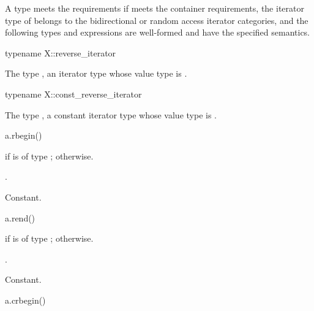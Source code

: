 \pnum
A type  meets the  requirements if
 meets the container requirements,
the iterator type of  belongs to the
bidirectional or random access iterator categories,
and
the following types and expressions are well-formed and have
the specified semantics.

%
\begin{itemdecl}
typename X::reverse_iterator
\end{itemdecl}

\begin{itemdescr}
\pnum
\result
The type ,
an iterator type whose value type is .
\end{itemdescr}

%
\begin{itemdecl}
typename X::const_reverse_iterator
\end{itemdecl}

\begin{itemdescr}
\pnum
\result
The type ,
a constant iterator type whose value type is .
\end{itemdescr}

%
\begin{itemdecl}
a.rbegin()
\end{itemdecl}

\begin{itemdescr}
\pnum
\result
{} if  is of type ;
 otherwise.

\pnum
\returns
{}.

\pnum
\complexity
Constant.
\end{itemdescr}

%
\begin{itemdecl}
a.rend()
\end{itemdecl}

\begin{itemdescr}
\pnum
\result
{} if  is of type ;
 otherwise.

\pnum
\returns
{}.

\pnum
\complexity
Constant.
\end{itemdescr}

%
\begin{itemdecl}
a.crbegin()
\end{itemdecl}

